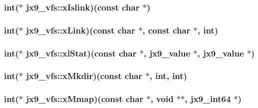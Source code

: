 \hypertarget{structjx9__vfs_a32afeee1f1b40ba211a0c503663f0117}{
\subsubsection[{x\-Islink}]{\setlength{\rightskip}{0pt plus 5cm}int($\ast$ jx9\-\_\-vfs\-::x\-Islink)(const char $\ast$)}}\label{da/d75/structjx9__vfs_a32afeee1f1b40ba211a0c503663f0117}
\hypertarget{structjx9__vfs_af127a9d111fbd5fe53267acef8797db4}{
\subsubsection[{x\-Link}]{\setlength{\rightskip}{0pt plus 5cm}int($\ast$ jx9\-\_\-vfs\-::x\-Link)(const char $\ast$, const char $\ast$, int)}}\label{da/d75/structjx9__vfs_af127a9d111fbd5fe53267acef8797db4}
\hypertarget{structjx9__vfs_a6d40957e331c4536df1cb687f45eef8f}{
\subsubsection[{xl\-Stat}]{\setlength{\rightskip}{0pt plus 5cm}int($\ast$ jx9\-\_\-vfs\-::xl\-Stat)(const char $\ast$, {\bf jx9\-\_\-value} $\ast$, {\bf jx9\-\_\-value} $\ast$)}}\label{da/d75/structjx9__vfs_a6d40957e331c4536df1cb687f45eef8f}
\hypertarget{structjx9__vfs_a6dcbf7acc6e0b8143a09c95975888bd0}{
\subsubsection[{x\-Mkdir}]{\setlength{\rightskip}{0pt plus 5cm}int($\ast$ jx9\-\_\-vfs\-::x\-Mkdir)(const char $\ast$, int, int)}}\label{da/d75/structjx9__vfs_a6dcbf7acc6e0b8143a09c95975888bd0}
\hypertarget{structjx9__vfs_a2a3d6d05901d6e18add5e20eec71a3fe}{
\subsubsection[{x\-Mmap}]{\setlength{\rightskip}{0pt plus 5cm}int($\ast$ jx9\-\_\-vfs\-::x\-Mmap)(const char $\ast$, void $\ast$$\ast$, {\bf jx9\-\_\-int64} $\ast$)}}\label{da/d75/structjx9__vfs_a2a3d6d05901d6e18add5e20eec71a3fe}
